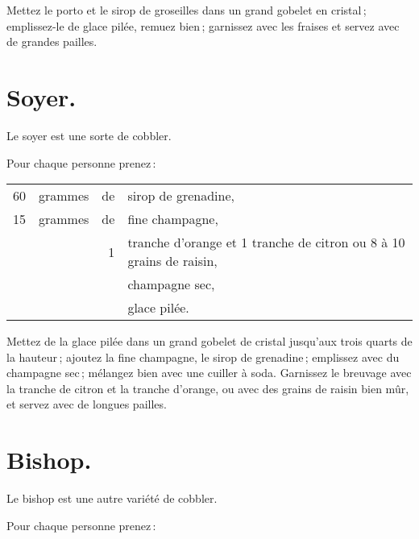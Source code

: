 Mettez le porto et le sirop de groseilles dans un grand gobelet en cristal ;
emplissez-le de glace pilée, remuez bien ; garnissez avec les fraises et servez
avec de grandes pailles.

\section*{\centering Soyer.}
{}

Le soyer est une sorte de cobbler.

\medskip

Pour chaque personne prenez :

\footnotesize
\begin{longtable}{rrrp{16em}}
     60 & grammes & de & sirop de grenadine,                                                              \\
     15 & grammes & de & fine champagne,                                                                  \\
        &         &  1 & tranche d'orange et 1 tranche de citron ou 8 à 10 grains de raisin,              \\
        &         &    & champagne sec,                                                                   \\
        &         &    & glace pilée.                                                                     \\
\end{longtable}
\normalsize

Mettez de la glace pilée dans un grand gobelet de cristal jusqu'aux trois quarts
de la hauteur ; ajoutez la fine champagne, le sirop de grenadine ; emplissez avec
du champagne sec ; mélangez bien avec une cuiller à soda. Garnissez le breuvage
avec la tranche de citron et la tranche d'orange, ou avec des grains de raisin bien
mûr, et servez avec de longues pailles.

\section*{\centering Bishop.}
{}

Le bishop est une autre variété de cobbler.

\medskip

Pour chaque personne prenez :

